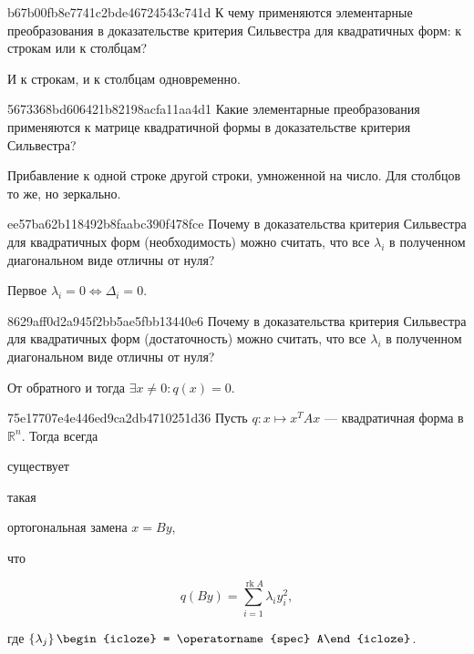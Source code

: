 \begin{note}{b67b00fb8e7741c2bde46724543c741d}
    К чему применяются элементарные преобразования в доказательстве критерия Сильвестра для квадратичных форм: к строкам или к столбцам?

    \begin{cloze}{1}
        И к строкам, и к столбцам одновременно.
    \end{cloze}
\end{note}

\begin{note}{5673368bd606421b82198acfa11aa4d1}
    Какие элементарные преобразования применяются к матрице квадратичной формы в доказательстве критерия Сильвестра?

    \begin{cloze}{1}
        Прибавление к одной строке другой строки, умноженной на число. Для столбцов то же, но зеркально.
    \end{cloze}
\end{note}

\begin{note}{ee57ba62b118492b8faabc390f478fce}
    Почему в доказательства критерия Сильвестра для квадратичных форм (необходимость) можно считать, что все \({ \lambda_i }\) в полученном диагональном виде отличны от нуля?

    \begin{cloze}{1}
        Первое \({ \lambda_i = 0 \iff \Delta_i = 0 }\).
    \end{cloze}
\end{note}

\begin{note}{8629aff0d2a945f2bb5ae5fbb13440e6}
    Почему в доказательства критерия Сильвестра для квадратичных форм (достаточность) можно считать, что все \({ \lambda_i }\) в полученном диагональном виде отличны от нуля?

    \begin{cloze}{1}
        От обратного и тогда \({ \exists x \neq 0 : q(x) = 0 }\).
    \end{cloze}
\end{note}

\begin{note}{75e17707e4e446ed9ca2db4710251d36}
    Пусть \({ q : x \mapsto x^{T}Ax }\) --- квадратичная форма в \({ \mathbb R^{n} }\).
    Тогда всегда \begin{icloze}{4}существует\end{icloze} такая \begin{icloze}{3}ортогональная замена \({ x = By }\),\end{icloze} что
    \begin{icloze}{1}
        \[
            q(By) = \sum_{i=1}^{\operatorname{rk} A} \lambda_i y_i^2,
        \]
    \end{icloze}
    где \({ \left\{ \lambda_j \right\} \begin{icloze}{2}= \operatorname{spec} A\end{icloze} }\).
\end{note}

